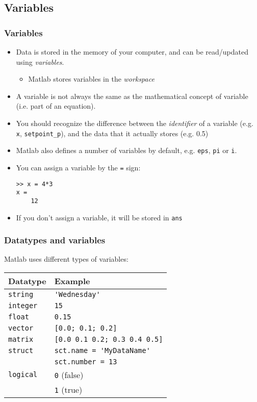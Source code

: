 \documentclass[11pt,table,final,fleqn,xcolor={usenames,dvipsnames}]{beamer}
\begin{document}
\subsection*{Variables}
\begin{frame}[fragile]
 \frametitle{Variables}
  \begin{itemize}
    \item Data is stored in the memory of your computer, and can be read/updated using \emph{variables}.
   \begin{itemize}
      \item Matlab stores variables in the \emph{workspace}
   \end{itemize}
    \item A variable is not always the same as the mathematical concept of variable (i.e. part of an equation).
    \item You should recognize the difference between the \emph{identifier} of a variable (e.g. \lstinline$x$, \lstinline$setpoint_p$), and the data that it actually stores (e.g. 0.5)
    \item Matlab also defines a number of variables by default, e.g. \lstinline$eps$, \lstinline$pi$ or \lstinline$i$.
    \item You can assign a variable by the \lstinline$=$ sign:
   \begin{lstlisting}
>> x = 4*3
x =
    12
   \end{lstlisting}
    \item If you don't assign a variable, it will be stored in \lstinline$ans$
 \end{itemize}
\end{frame}

\begin{frame}[fragile]
 \frametitle{Datatypes and variables}
 Matlab uses different types of variables:
     \begin{longtable}{l!{\vrule}l}
      Datatype        & Example \\ \hline
      \texttt{string} & \lstinline$'Wednesday'$ \\
      \texttt{integer}& \lstinline$15$ \\
      \texttt{float}  & \lstinline$0.15$ \\
      \texttt{vector} & \lstinline$[0.0; 0.1; 0.2]$ \\
      \texttt{matrix} & \lstinline$[0.0 0.1 0.2; 0.3 0.4 0.5]$ \\
      \texttt{struct} & \lstinline$sct.name = 'MyDataName'$ \\
  & \lstinline$sct.number = 13$ \\
 \texttt{logical}& \lstinline$0$ (false)  \\
                      & \lstinline$1$ (true) \\
    \end{longtable}
\end{frame}
\end{document}
